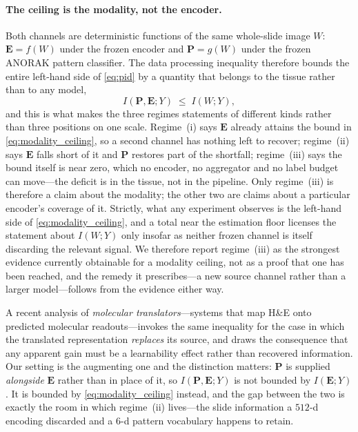 \paragraph{The ceiling is the modality, not the encoder.}
Both channels are deterministic functions of the same whole-slide image
$W$: $\mathbf{E}=f(W)$ under the frozen \ctranspath{} encoder and
$\mathbf{P}=g(W)$ under the frozen ANORAK pattern classifier. The data
processing inequality\cite{cover2006elements} therefore bounds the
entire left-hand side of \cref{eq:pid} by a quantity that belongs to the
tissue rather than to any model,
\begin{equation}
I\!\left(\mathbf{P},\mathbf{E};Y\right) \;\leq\; I\!\left(W;Y\right),
\label{eq:modality_ceiling}
\end{equation}
and this is what makes the three regimes statements of different kinds
rather than three positions on one scale. Regime~(i) says $\mathbf{E}$
already attains the bound in \cref{eq:modality_ceiling}, so a second
channel has nothing left to recover; regime~(ii) says $\mathbf{E}$ falls
short of it and $\mathbf{P}$ restores part of the shortfall; regime~(iii)
says the bound itself is near zero, which no encoder, no aggregator and
no label budget can move---the deficit is in the tissue, not in the
pipeline. Only regime~(iii) is therefore a claim about the modality; the
other two are claims about a particular encoder's coverage of it.
Strictly, what any experiment observes is the left-hand side of
\cref{eq:modality_ceiling}, and a total near the estimation floor
licenses the statement about $I(W;Y)$ only insofar as neither frozen
channel is itself discarding the relevant signal. We therefore report
regime~(iii) as the strongest evidence currently obtainable for a
modality ceiling, not as a proof that one has been reached, and the
remedy it prescribes---a new source channel rather than a larger
model---follows from the evidence either way.

A recent analysis of \emph{molecular translators}---systems that map
H\&E onto predicted molecular readouts---invokes the same inequality for
the case in which the translated representation \emph{replaces} its
source, and draws the consequence that any apparent gain must be a
learnability effect rather than recovered
information.\cite{saisan2026ceilings}
Our setting is the augmenting one and the distinction matters:
$\mathbf{P}$ is supplied \emph{alongside} $\mathbf{E}$ rather than in
place of it, so $I(\mathbf{P},\mathbf{E};Y)$ is not bounded by
$I(\mathbf{E};Y)$. It is bounded by \cref{eq:modality_ceiling} instead,
and the gap between the two is exactly the room in which regime~(ii)
lives---the slide information a $512$-d encoding discarded and a
$6$-d pattern vocabulary happens to retain.

